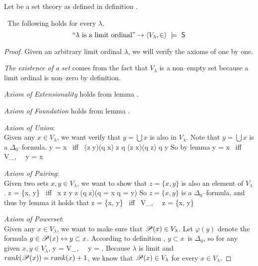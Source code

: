 Let  be a set theory as defined in definition . 
\begin{lemma}\label{lemma:scm_s_is_limit}\
The following holds for every $\lambda$.
\begin{equation}
\mbox{``$\lambda$ is a limit ordinal''} \then \langle V_\lambda, \in \rangle~\models~\sf{S} %
\end{equation}
\end{lemma}

\begin{proof}
Given an arbitrary limit ordinal $\lambda$, we will verify the axioms of  one by one.
\bce[(i)]
\item \emph{The existence of a set} comes from the fact that $V_\lambda$ is a non–empty set because a limit ordinal is non–zero by definition.

\item \emph{\emph{Axiom of Extensionality}} holds from lemma .

\item \emph{Axiom of Foundation} holds from lemma .

\item \emph{Axiom of Union}:\\
Given any $x \in V_\lambda$, we want verify that $y = \bigcup x$ is also in $V_\lambda$. Note that $y = \bigcup x$ is a $\Delta_0$–formula.
\beq
y = \bigcup x \mbox{ iff } (\forall z \in y)(\exists q \in x) z \in q \et (\forall z \in x)(\forall q \in z) q \in y
\eeq
So by lemma 
\beq
y = \bigcup x \mbox{ iff } \langle V_\lambda, \in \rangle~\models~y = \bigcup x
\eeq

\item \emph{Axiom of Pairing}: \\
Given two sets $x, y \in V_\lambda$, we want to show that $z = \{x, y\}$ is also an element of $V_\lambda$.
\beq
z = \{x, y\} \mbox{ iff } x \in z \et y \in z \et (\forall q \in z)(q = x \lor q = y)
\eeq
So $z = \{x, y\}$ is a $\Delta_0$–formula, and thus by lemma  it holds that
\beq
z = \{x, y\} \mbox{ iff } \langle V_\lambda, \in \rangle~\models~z = \{x, y\}
\eeq


\item \emph{Axiom of Powerset}: \\
Given any $x \in V_\lambda$, we want to make sure that $\mathscr{P} (x) \in V_\lambda$. Let $\varphi(y)$ denote the formula $y \in \mathscr{P} (x) \leftrightarrow y \subset x$.
According to definition \bref{def:subset}, $y \subset x$ is $\Delta_0$, so for any given $x, y \in V_\lambda$,
\beq
y =  \iff \langle V_\lambda, \in \rangle~\models~y = \mbox{.}
\eeq
Because $\lambda$ is limit and $rank(\mathscr{P} (x)) = rank(x)+1$, we know that $\mathscr{P} (x) \in V_\lambda$ for every $x \in V_\lambda$.


\end{proof}
